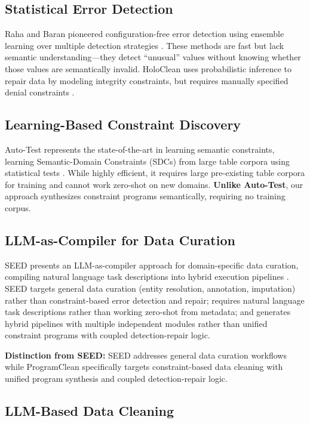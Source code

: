 \documentclass{article}
\begin{document}
\subsection{Statistical Error Detection}

Raha and Baran pioneered configuration-free error detection using ensemble learning over multiple detection strategies \citep{mahdavi2019raha, mahdavi2020baran}. These methods are fast but lack semantic understanding---they detect ``unusual'' values without knowing whether those values are semantically invalid. HoloClean uses probabilistic inference to repair data by modeling integrity constraints, but requires manually specified denial constraints \citep{rekatsinas2017holoclean}.

\subsection{Learning-Based Constraint Discovery}

Auto-Test represents the state-of-the-art in learning semantic constraints, learning Semantic-Domain Constraints (SDCs) from large table corpora using statistical tests \citep{he2025autotest}. While highly efficient, it requires large pre-existing table corpora for training and cannot work zero-shot on new domains. \textbf{Unlike Auto-Test}, our approach synthesizes constraint programs semantically, requiring no training corpus.

\subsection{LLM-as-Compiler for Data Curation}

SEED presents an LLM-as-compiler approach for domain-specific data curation, compiling natural language task descriptions into hybrid execution pipelines \citep{chen2024seed}. SEED targets general data curation (entity resolution, annotation, imputation) rather than constraint-based error detection and repair; requires natural language task descriptions rather than working zero-shot from metadata; and generates hybrid pipelines with multiple independent modules rather than unified constraint programs with coupled detection-repair logic.

\textbf{Distinction from SEED:} SEED addresses general data curation workflows while ProgramClean specifically targets constraint-based data cleaning with unified program synthesis and coupled detection-repair logic.

\subsection{LLM-Based Data Cleaning}
\end{document}
